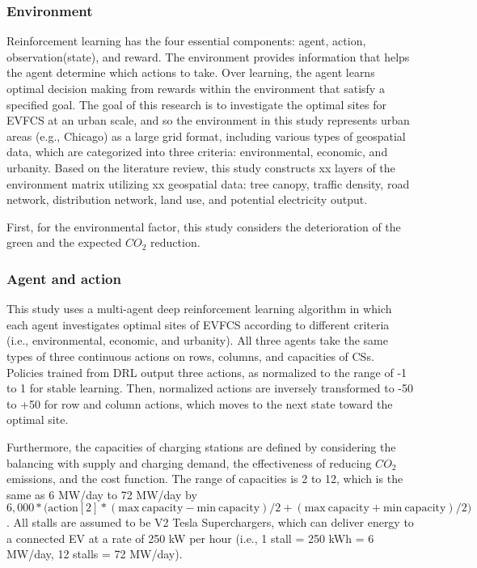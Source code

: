 \documentclass[preprint,12pt]{elsarticle}
\begin{document}
\subsubsection{Environment}
Reinforcement learning has the four essential components: agent, action, observation(state), and reward. 
The environment provides information that helps the agent determine which actions to take. Over learning, the agent learns optimal decision making from rewards within the environment that satisfy a specified goal. The goal of this research is to investigate the optimal sites for EVFCS at an urban scale, and so the environment in this study represents urban areas (e.g., Chicago) as a large grid format, including various types of geospatial data, which are categorized into three criteria: environmental, economic, and urbanity. Based on the literature review, this study constructs xx layers of the environment matrix utilizing xx geospatial data: tree canopy,  traffic density, road network, distribution network, land use, and potential electricity output. 

First, for the environmental factor, this study considers the deterioration of the green and the expected $CO_2$ reduction.  

\subsubsection{Agent and action}
This study uses a multi-agent deep reinforcement learning algorithm in which each agent investigates optimal sites of EVFCS according to different criteria (i.e., environmental, economic, and urbanity). All three agents take the same types of three continuous actions on rows, columns, and capacities of CSs. Policies trained from DRL output three actions, as normalized to the range of -1 to 1 for stable learning. Then, normalized actions are inversely transformed to -50 to +50 for row and column actions, which moves to the next state toward the optimal site. 

Furthermore, the capacities of charging stations are defined by considering the balancing with supply and charging demand, the effectiveness of reducing $CO_2$ emissions, and the cost function. The range of capacities is 2 to 12, which is the same as 6 MW/day to 72 MW/day by $6,000 * (\mathrm{action[2] * (\mathrm{max \: capacity} - \mathrm{min \: capacity})/2 + (\mathrm{max \: capacity} + \mathrm{min \: capacity})/2)}$. All stalls are assumed to be V2 Tesla Superchargers, which can deliver energy to a connected EV at a rate of 250 kW per hour (i.e., 1 stall = 250 kWh = 6 MW/day, 12 stalls = 72 MW/day). 
\end{document}
